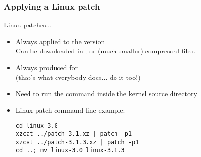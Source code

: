 \begin{frame}[fragile]
  \frametitle{Applying a Linux patch}
  Linux patches...
  \begin{itemize}
  \item Always applied to the  version\\
    Can be downloaded in ,  or  (much
    smaller) compressed files.
  \item Always produced for \\
    (that's what everybody does... do it too!)
  \item Need to run the  command inside the kernel source
    directory
  \item Linux patch command line example:\\
\begin{verbatim}
cd linux-3.0
xzcat ../patch-3.1.xz | patch -p1
xzcat ../patch-3.1.3.xz | patch -p1
cd ..; mv linux-3.0 linux-3.1.3
\end{verbatim}
  \end{itemize}
\end{frame}
